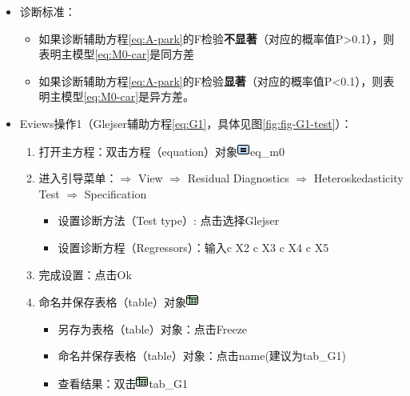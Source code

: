 \documentclass[12pt,(landscape,a4paper),(portrait,a4paper)]{article}
\providecommand{\tightlist}{%
  \setlength{\itemsep}{0pt}\setlength{\parskip}{0pt}}
\begin{document}
\begin{itemize}
\tightlist
\item
  诊断标准：

  \begin{itemize}
  \tightlist
  \item
    如果诊断辅助方程\eqref{eq:A-park}的F检验\textbf{不显著}（对应的概率值P\textgreater{}0.1），则表明主模型\eqref{eq:M0-car}是同方差
  \item
    如果诊断辅助方程\eqref{eq:A-park}的F检验\textbf{显著}（对应的概率值P\textless{}0.1），则表明主模型\eqref{eq:M0-car}是异方差。
  \end{itemize}
\item
  Eviews操作1（Glejser辅助方程\eqref{eq:G1}，具体见图\ref{fig:fig-G1-test}）：

  \begin{enumerate}
  \def\labelenumi{\arabic{enumi})}
  \tightlist
  \item
    打开主方程：双击方程（equation）对象\includegraphics{picture/object/Equation.png}eq\_m0\\
  \item
    进入引导菜单：\(\Rightarrow\) View \(\Rightarrow\) Residual
    Diagnostics \(\Rightarrow\) Heteroskedasticity Test \(\Rightarrow\)
    Specification

    \begin{itemize}
    \tightlist
    \item
      设置诊断方法（Test type）: 点击选择Glejser
    \item
      设置诊断方程（Regressors）：输入c X2 c X3 c X4 c X5\\
    \end{itemize}
  \item
    完成设置：点击Ok\\
  \item
    命名并保存表格（table）对象\includegraphics{picture/object/Table.png}

    \begin{itemize}
    \tightlist
    \item
      另存为表格（table）对象：点击Freeze
    \item
      命名并保存表格（table）对象：点击name(建议为tab\_G1)
    \item
      查看结果：双击\includegraphics{picture/object/Table.png}tab\_G1
    \end{itemize}
  \end{enumerate}
\end{itemize}
\end{document}

